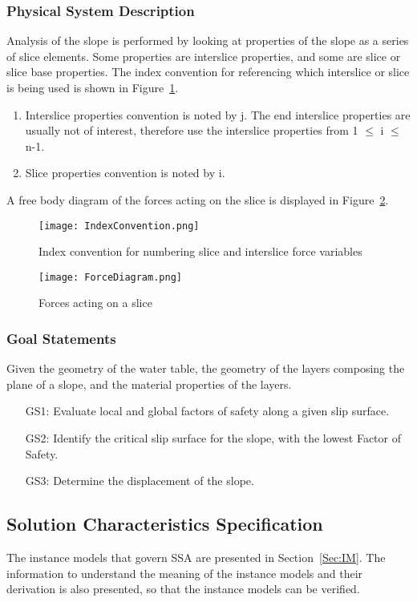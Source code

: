 \documentclass[12pt]{article}
\begin{document}
\subsubsection{Physical System Description}
\label{Sec:PSD}
Analysis of the slope is performed by looking at properties of the slope as a series of slice elements. Some properties are interslice properties, and some are slice or slice base properties.  The index convention for referencing which interslice or slice is being used is shown in Figure~\ref{Figure:Icfnsaifv}.
\begin{enumerate}
\item{Interslice properties convention is noted by j. The end interslice properties are usually not of interest, therefore use the interslice properties from 1 $\leq{}$ i $\leq{}$ n-1.}
\item{Slice properties convention is noted by i.}
\end{enumerate}
A free body diagram of the forces acting on the slice is displayed in Figure~\ref{Figure:Faoas}.
\begin{figure}
\begin{center}
\texttt{[image: IndexConvention.png]}
\caption{Index convention for numbering slice and interslice force variables}
\label{Figure:Icfnsaifv}
\end{center}
\end{figure}
\begin{figure}
\begin{center}
\texttt{[image: ForceDiagram.png]}
\caption{Forces acting on a slice}
\label{Figure:Faoas}
\end{center}
\end{figure}
\subsubsection{Goal Statements}
\label{Sec:GS}
Given the geometry of the water table, the geometry of the layers composing the plane of a slope, and the material properties of the layers.
\begin{itemize}
\item[GS1:]Evaluate local and global factors of safety along a given slip surface.
\item[GS2:]Identify the critical slip surface for the slope, with the lowest Factor of Safety.
\item[GS3:]Determine the displacement of the slope.
\end{itemize}
\subsection{Solution Characteristics Specification}
\label{Sec:SCS}
The instance models that govern SSA are presented in Section~\ref{Sec:IM}.  The information to understand the meaning of the instance models and their derivation is also presented, so that the instance models can be verified.
\end{document}
